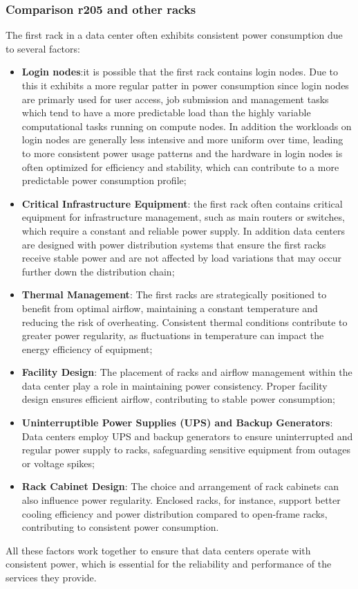 \subsubsection{Comparison r205 and other racks}
The first rack in a data center often exhibits consistent power consumption due to several factors:
\begin{itemize}
    \item \textbf{Login nodes}:it is possible that the first rack contains login nodes. Due to this it exhibits a more regular patter in power consumption since login nodes are primarly used for user access, job submission and management tasks which tend to have a more predictable load than the highly variable computational tasks running on compute nodes. In addition the workloads on login nodes are generally less intensive and more uniform over time, leading to more consistent power usage patterns and the hardware in login nodes is often optimized for efficiency and stability, which can contribute to a more predictable power consumption profile;
    \item \textbf{Critical Infrastructure Equipment}: the first rack often contains critical equipment for infrastructure management, such as main routers or switches, which require a constant and reliable power supply. In addition data centers are designed with power distribution systems that ensure the first racks receive stable power and are not affected by load variations that may occur further down the distribution chain;
    \item \textbf{Thermal Management}: The first racks are strategically positioned to benefit from optimal airflow, maintaining a constant temperature and reducing the risk of overheating. Consistent thermal conditions contribute to greater power regularity, as fluctuations in temperature can impact the energy efficiency of equipment;
    \item \textbf{Facility Design}: The placement of racks and airflow management within the data center play a role in maintaining power consistency. Proper facility design ensures efficient airflow, contributing to stable power consumption;
    \item \textbf{Uninterruptible Power Supplies (UPS) and Backup Generators}: Data centers employ UPS and backup generators to ensure uninterrupted and regular power supply to racks, safeguarding sensitive equipment from outages or voltage spikes;
    \item \textbf{Rack Cabinet Design}: The choice and arrangement of rack cabinets can also influence power regularity. Enclosed racks, for instance, support better cooling efficiency and power distribution compared to open-frame racks, contributing to consistent power consumption.
\end{itemize}
All these factors work together to ensure that data centers operate with consistent power, which is essential for the reliability and performance of the services they provide.
\clearpage

